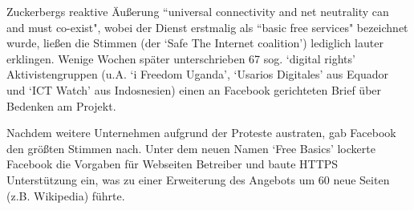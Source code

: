 \documentclass{article}
\begin{document}
\medskip

Zuckerbergs reaktive Äußerung ``universal connectivity and net neutrality can and must co-exist", wobei der Dienst erstmalig als ``basic free services" bezeichnet wurde, ließen die Stimmen (der `Safe The Internet coalition') lediglich lauter erklingen.
Wenige Wochen später unterschrieben 67 sog. `digital rights' Aktivistengruppen (u.A. `i Freedom Uganda', `Usarios Digitales' aus Equador und `ICT Watch' aus Indosnesien) einen an Facebook gerichteten Brief über Bedenken am Projekt.

\medskip

Nachdem weitere Unternehmen aufgrund der Proteste austraten, gab Facebook den größten Stimmen nach. Unter dem neuen Namen `Free Basics' lockerte Facebook die Vorgaben für Webseiten Betreiber und baute HTTPS Unterstützung ein, was zu einer Erweiterung des Angebots um 60 neue Seiten (z.B. Wikipedia) führte.

\end{document}
